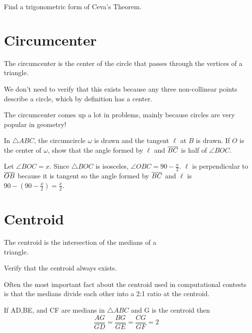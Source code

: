 \documentclass[11pt]{scrartcl}
\theoremstyle{plain}
\begin{document}
    \begin{exercise}
        Find a trigonometric form of Ceva's Theorem.
    \end{exercise}

\section{Circumcenter}
\begin{definition}
    The circumcenter is the center of the circle that passes through the vertices of a triangle. 
\end{definition}
\begin{remark}
    We don't need to verify that this exists because any three non-collinear points describe a circle, which by definition has a center.
\end{remark}

The circumcenter comes up a lot in problems, mainly because circles are very popular in geometry!
\begin{example}
    In $\triangle ABC$, the circumcircle $\omega$ is drawn and the tangent $\ell$ at $B$ is drawn. If $O$ is the center of $\omega$,
    show that the angle formed by $\ell$ and $\overline{BC}$ is half of $\angle BOC$.
\end{example}
\begin{soln}
    Let $\angle BOC = x$. Since $\triangle BOC$ is isosceles, $\angle OBC = 90-\frac{x}{2}$. $\ell$ is perpendicular to $\overline{OB}$ because it is tangent so 
    the angle formed by $\overline{BC}$ and $\ell$ is $90-(90-\frac{x}{2})=\frac{x}{2}$.
\end{soln}
\section{Centroid}
    
        \begin{definition}
            The centroid is the intersection of the medians of a \\triangle.
       \end{definition} 
    
       
    \begin{exercise}
        Verify that the centroid always exists.
    \end{exercise}
    Often the most important fact about the centroid used in computational
    contests is that the medians divide each other into a 2:1 ratio at the centroid.
    
        \begin{theorem}
            If AD,BE, and CF are medians in $\triangle ABC$ and G is the centroid then $$\frac{AG}{GD}=\frac{BG}{GE}=\frac{CG}{GF}=2$$
        \end{theorem}
    
\end{document}
